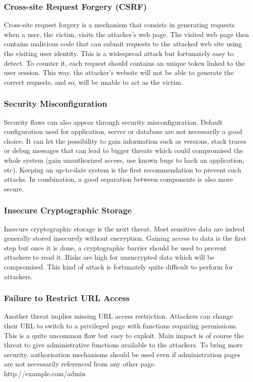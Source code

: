 \subsubsection{Cross-site Request Forgery (CSRF)}
Cross-site request forgery is a mechanism that consists in generating requests
when a user, the victim, visits the attacker's web page. The visited web page
then contains malicious code that can submit requests to the attacked web site
using the visiting user identity. This is a widespread attack but fortunately
easy to detect. To counter it, each request should contains an unique token
linked to the user session. This way, the attacker's website will not be able
to generate the correct requests, and so, will be unable to act as the victim.


\subsubsection{Security Misconfiguration}
Security flaws can also appear through security misconfiguration. Default
configuration used for application, server or database are not necessarily a
good choice. It can let the possibility to gain information such as versions,
stack traces or debug messages that can lead to bigger threats which could
compromised the whole system (gain unauthorized access, use known bugs to hack
an application, etc). Keeping an up-to-date system is the first recommendation
to prevent such attacks. In combination, a good separation between components
is also more secure.

\subsubsection{Insecure Cryptographic Storage}
Insecure cryptographic storage is the next threat. Most sensitive data are
indeed generally stored insecurely without encryption. Gaining access to data is
the first step but once it is done, a cryptographic barrier should be used to
prevent attackers to read it. Risks are high for unencrypted data which will
be compromised. This kind of attack is fortunately quite difficult to perform
for attackers.

\subsubsection{Failure to Restrict URL Access}
Another threat implies missing URL access restriction. Attackers can change
their URL to switch to a privileged page with functions requiring
permissions. This is a quite uncommon flaw but easy to exploit. Main impact is
of course the threat to give administrative functions available to the
attackers. To bring more security, authorisation mechanisms should be used
even if administration pages are not necessarily referenced from any other
page.
\\
http://example.com/admin

